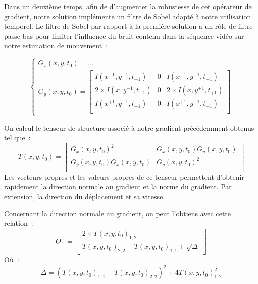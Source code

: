 \documentclass[fleqn,10pt]{SelfArx} %
\newcommand{\T}{T(x, y, t_{0})}
\begin{document}
Dans un deuxième temps, afin de d'augmenter la robustesse de cet opérateur de gradient,
notre solution implémente un filtre de Sobel adapté à notre utilisation temporel.
Le filtre de Sobel par rapport à la première solution a un rôle de filtre passe bas pour limiter 
l'influence du bruit contenu dans la séquence vidéo sur notre estimation de mouvement~:

\[
    \begin{cases}
        G_{x}(x,y,t_{0}) = \ldots \\
        G_{y}(x,y,t_{0}) = 
        \begin{bmatrix}
            I(x^{-1}, y^{-1}, t_{-1}) & 0 & I(x^{-1}, y^{+1}, t_{+1}) \\
            2 \times I(x,      y^{-1}, t_{-1}) & 0 & 2 \times I(x,      y^{+1}, t_{+1}) \\
            I(x^{+1}, y^{-1}, t_{-1}) & 0 & I(x^{+1}, y^{+1}, t_{+1}) \\
        \end{bmatrix}
    \end{cases}
\]

On calcul le tenseur de structure associé à notre gradient précédemment obtenus tel que~:
\[
    T(x, y, t_{0}) = 
    \begin{bmatrix}
        G_{x}(x,y,t_{0})^{2} & G_{x}(x,y,t_{0})G_{y}(x,y,t_{0}) \\
        G_{y}(x,y,t_{0})G_{x}(x,y,t_{0}) & G_{y}(x,y,t_{0})^{2} \\
    \end{bmatrix}
\]
Les vecteurs propres et les valeurs propres de ce tenseur permettent d'obtenir rapidement la direction normale
au gradient et la norme du gradient. Par extension, la direction du déplacement et sa vitesse.

Concernant la direction normale au gradient, on peut l'obtiens avec cette relation~:
\[
    \Theta^{+} = 
    \begin{bmatrix}
        2 \times \T_{1,2} \\
        \T_{2,2} - \T_{1,1} + \sqrt{\Delta}
    \end{bmatrix}
\]
Où~:
\[
    \Delta = (\T_{1,1} - \T_{2,2})^{2} + 4 \T_{1,2}^{2}
\]
\end{document}

